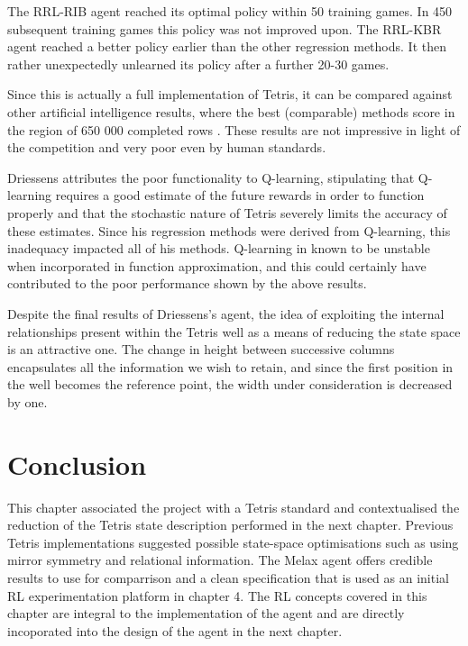 \documentclass{rucsthesis}
\begin{document}
The RRL-RIB agent reached its optimal policy within 50 training games. In 450 subsequent training games this policy was not improved upon. The RRL-KBR agent reached a better policy earlier than the other regression methods. It then rather unexpectedly unlearned its policy after a further 20-30 games.

Since this is actually a full implementation of Tetris, it can be compared against other artificial intelligence results, where the best (comparable) methods score in the region of 650 000 completed rows \citep{tetstand}. These results are not impressive in light of the competition and very poor even by human standards. 

Driessens attributes the poor functionality to Q-learning, stipulating that Q-learning requires a good estimate of the future rewards in order to function properly and that the stochastic nature of Tetris severely limits the accuracy of these estimates. Since his regression methods were derived from Q-learning, this inadequacy impacted all of his methods. Q-learning in known to be unstable \citep{keepaway,thrun93issues} when incorporated in function approximation, and this could certainly have contributed to the poor performance shown by the above results.

Despite the final results of Driessens's agent, the idea of exploiting the internal relationships present within the Tetris well as a means of reducing the state space is an attractive one. The change in height between successive columns encapsulates all the information we wish to retain, and since the first position in the well becomes the reference point, the width under consideration is decreased by one.

\section{Conclusion}

This chapter associated the project with a Tetris standard and contextualised the reduction of the Tetris state description performed in the next chapter. Previous Tetris implementations suggested possible state-space optimisations such as using mirror symmetry and relational information. The Melax agent offers credible results to use for comparrison and a clean specification that is used as an initial RL experimentation platform in chapter 4. The RL concepts covered in this chapter are integral to the implementation of the agent and are directly incoporated into the design of the agent in the next chapter.
\end{document}
